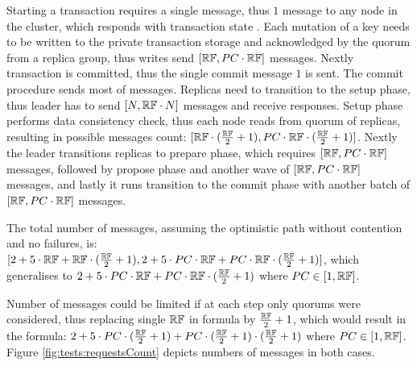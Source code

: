 Starting a transaction requires a single message, thus $1$ message to any node in the cluster, which responds with transaction state \txState.
Each mutation of a key needs to be written to the private transaction storage \txStorage and acknowledged by the quorum from a replica group, thus writes send $[\mathbb{RF},PC\cdot\mathbb{RF}]$ messages.
Nextly transaction is committed, thus the single commit message $1$ is sent.
The commit procedure sends most of messages.
Replicas need to transition to the setup phase, thus leader has to send $[N,\mathbb{RF}\cdot N]$ messages and receive responses.
Setup phase performs data consistency check, thus each node reads from quorum of replicas, resulting in possible messages count: $[\mathbb{RF} \cdot (\frac{\mathbb{RF}}{2} + 1),PC\cdot\mathbb{RF} \cdot (\frac{\mathbb{RF}}{2} + 1)]$.
Nextly the leader transitions replicas to prepare phase, which requires $[\mathbb{RF},PC\cdot\mathbb{RF}]$ messages, followed by propose phase and another wave of $[\mathbb{RF},PC\cdot\mathbb{RF}]$ messages, and lastly it runs transition to the commit phase with another batch of $[\mathbb{RF},PC\cdot\mathbb{RF}]$ messages.

The total number of messages, assuming the optimistic path without contention and no failures, 
is: $[2 + 5 \cdot \mathbb{RF} + \mathbb{RF} \cdot (\frac{\mathbb{RF}}{2} + 1), 2 + 5 \cdot PC\cdot\mathbb{RF} + PC \cdot \mathbb{RF} \cdot (\frac{\mathbb{RF}}{2} + 1)]$,
which generalises to $2 + 5 \cdot PC\cdot\mathbb{RF} + PC \cdot \mathbb{RF} \cdot (\frac{\mathbb{RF}}{2} + 1)$ where $PC \in [1, \mathbb{RF}]$.

Number of messages could be limited if at each step only quorums were considered, thus replacing single $\mathbb{RF}$ in formula by $\frac{\mathbb{RF}}{2} + 1$, which would result in the formula: 
$2 + 5 \cdot PC \cdot (\frac{\mathbb{RF}}{2} + 1) + PC \cdot (\frac{\mathbb{RF}}{2} + 1) \cdot (\frac{\mathbb{RF}}{2} + 1)$ where $PC \in [1, \mathbb{RF}]$.
Figure \ref{fig:tests:requestsCount} depicts numbers of messages in both cases.


